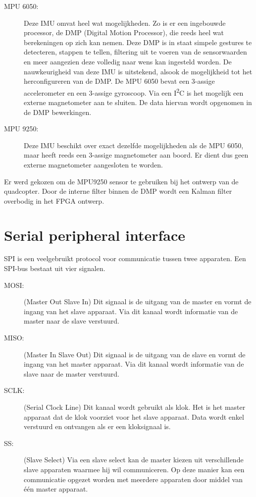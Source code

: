 					\begin{description}

						\item[MPU 6050:] Deze IMU omvat heel wat mogelijkheden. Zo is er een ingebouwde processor, de DMP (Digital Motion Processor), die reeds heel wat berekeningen op zich kan nemen. Deze DMP is in staat simpele gestures te detecteren, stappen te tellen, filtering uit te voeren van de sensorwaarden en meer aangezien deze volledig naar wens kan ingesteld worden. De nauwkeurigheid van deze IMU is uitstekend, alsook de mogelijkheid tot het herconfigureren van de DMP. De MPU 6050 bevat een 3-assige accelerometer en een 3-assige gyroscoop. Via een I\textsuperscript{2}C is het mogelijk een externe magnetometer aan te sluiten. De data hiervan wordt opgenomen in de DMP bewerkingen.
						
						\item[MPU 9250:] Deze IMU beschikt over exact dezelfde mogelijkheden als de MPU 6050, maar heeft reeds een 3-assige magnetometer aan boord. Er dient dus geen externe magnetometer aangesloten te worden.

					\end{description}

				\par Er werd gekozen om de MPU9250 sensor te gebruiken bij het ontwerp van de quadcopter. Door de interne filter binnen de DMP wordt een Kalman filter overbodig in het FPGA ontwerp.

		\section{Serial peripheral interface}

			\par SPI is een veelgebruikt protocol voor communicatie tussen twee apparaten. Een SPI-bus bestaat uit vier signalen.

				\begin{description}

					\item[MOSI:] (Master Out Slave In) Dit signaal is de uitgang van de master en vormt de ingang van het slave apparaat. Via dit kanaal wordt informatie van de master naar de slave verstuurd.

					\item[MISO:] (Master In Slave Out) Dit signaal is de uitgang van de slave en vormt de ingang van het master apparaat. Via dit kanaal wordt informatie van de slave naar de master verstuurd.

					\item[SCLK:] (Serial Clock Line) Dit kanaal wordt gebruikt als klok. Het is het master apparaat dat de klok voorziet voor het slave apparaat. Data wordt enkel verstuurd en ontvangen als er een kloksignaal is.

					\item[SS:] (Slave Select) Via een slave select kan de master kiezen uit verschillende slave apparaten waarmee hij wil communiceren. Op deze manier kan een communicatie opgezet worden met meerdere apparaten door middel van \'e\'en master apparaat.

				\end{description}

